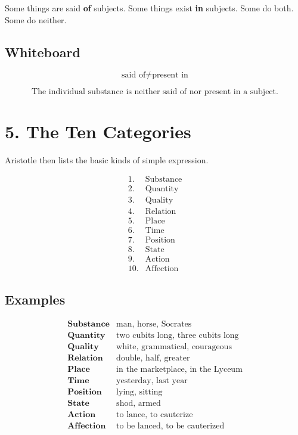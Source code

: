 \documentclass[12pt]{article}
\begin{document}
Some things are said \textbf{of} subjects. Some things exist \textbf{in}
subjects. Some do both. Some do neither.

\subsection*{Whiteboard}

\[
\text{said of} \neq \text{present in}
\]

\[
\boxed{
\text{The individual substance is neither said of nor present in a subject.}
}
\]

\section*{5. The Ten Categories}

Aristotle then lists the basic kinds of simple expression.

\[
\begin{array}{ll}
1. & \text{Substance} \\
2. & \text{Quantity} \\
3. & \text{Quality} \\
4. & \text{Relation} \\
5. & \text{Place} \\
6. & \text{Time} \\
7. & \text{Position} \\
8. & \text{State} \\
9. & \text{Action} \\
10. & \text{Affection}
\end{array}
\]

\subsection*{Examples}

\[
\begin{array}{ll}
\textbf{Substance} & \text{man, horse, Socrates} \\
\textbf{Quantity} & \text{two cubits long, three cubits long} \\
\textbf{Quality} & \text{white, grammatical, courageous} \\
\textbf{Relation} & \text{double, half, greater} \\
\textbf{Place} & \text{in the marketplace, in the Lyceum} \\
\textbf{Time} & \text{yesterday, last year} \\
\textbf{Position} & \text{lying, sitting} \\
\textbf{State} & \text{shod, armed} \\
\textbf{Action} & \text{to lance, to cauterize} \\
\textbf{Affection} & \text{to be lanced, to be cauterized}
\end{array}
\]
\end{document}
